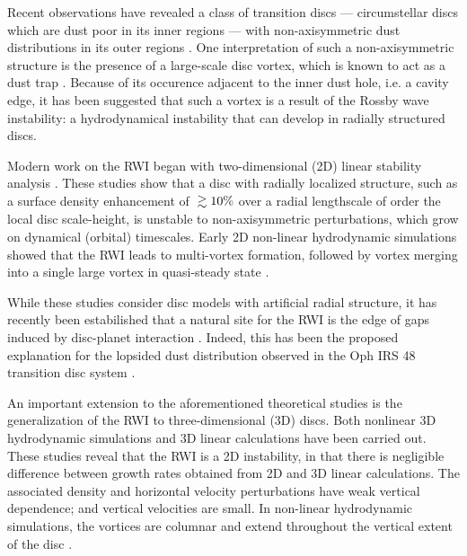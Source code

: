 \documentclass[useAMS,usenatbib]{mn2e}
\newcommand{\gtrsim}{\;\raisebox{-.8ex}{$\buildrel{\textstyle>}\over\sim$}\;}
\begin{document}

Recent observations have revealed a class of transition discs ---
circumstellar discs which are dust poor in its inner regions ---  
with non-axisymmetric dust distributions in its outer 
regions \citep{brown09,mayama12,marel13,isella13}.  
One interpretation of such a non-axisymmetric structure is the presence of
a large-scale disc vortex, which is known to act as a dust trap
\citep{barge95,inaba06,birnstiel13,ataiee13,lyra13}.  
Because of its occurence adjacent to the inner dust
hole, i.e. a cavity edge, it has been suggested that such a vortex is
a result of the Rossby wave instability: a hydrodynamical instability
that can develop in radially structured discs.  

Modern work on the RWI began with two-dimensional (2D) linear
stability analysis \citep{lovelace99,li00}. These studies show that a
disc with radially localized 
structure, such as a surface density enhancement of $\gtrsim 10\%$ over a
radial lengthscale of order the local disc scale-height, is unstable to
non-axisymmetric perturbations, which grow on dynamical (orbital)
timescales. Early 2D non-linear hydrodynamic simulations showed that
the RWI leads to multi-vortex formation, followed by vortex merging into
a single large vortex in quasi-steady state \citep{li01,inaba06}. 

While these studies consider disc models with artificial radial
structure, it has recently been estabilished that a natural site for
the RWI is the edge of gaps induced by disc-planet interaction 
\citep{koller03,li05,valborro07,li09,lyra09b,lin10,lin11a}. Indeed, this has
been the proposed explanation for the lopsided dust distribution
observed in the Oph IRS 48 transition disc system \citep{marel13}.       

An important extension to the aforementioned theoretical studies is
the generalization of the RWI to three-dimensional (3D) 
discs. Both nonlinear 3D hydrodynamic simulations 
\citep{meheut10,meheut12b,lin12b,lyra12} and 3D linear calculations
\citep{umurhan10,meheut12,lin12,lin13} have been carried out. 
These studies reveal that the RWI is a 2D instability,
in that there is negligible difference between growth rates obtained
from 2D and 3D linear calculations. The associated density and
horizontal velocity perturbations have weak vertical dependence; and  
vertical velocities are small. In non-linear hydrodynamic simulations,
the vortices are columnar and extend throughout the vertical extent of
the disc \citep{richard13}.  
\end{document}

